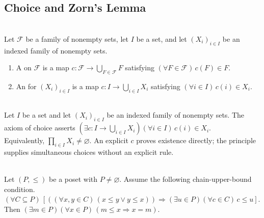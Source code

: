 \subsection{Choice and Zorn's Lemma}

\begin{definition} \label{def:choice-function} \\
Let $\mathcal{F}$ be a family of nonempty sets, let $I$ be a set, and let $(X_i)_{i\in I}$ be an indexed family of nonempty sets.
\begin{enumerate}[label=(\roman*)]
\setlength{\itemsep}{0pt}
\item A  on $\mathcal{F}$ is a map $c:\mathcal{F}\to\bigcup\limits_{F\in\mathcal{F}}F$ satisfying $(\forall F\in\mathcal{F})\,c(F)\in F$.
\item An  for $(X_i)_{i\in I}$ is a map $c:I\to\bigcup\limits_{i\in I}X_i$ satisfying $(\forall i\in I)\,c(i)\in X_i$.
\end{enumerate}
\end{definition}

\begin{principle} \label{princ:axiom-of-choice-analysis} \\
Let $I$ be a set and let $(X_i)_{i\in I}$ be an indexed family of nonempty sets. The axiom of choice asserts $(\exists c:I\to\bigcup\limits_{i\in I}X_i)(\forall i\in I)\,c(i)\in X_i$.\\
Equivalently, $\prod\limits_{i\in I}X_i\neq\varnothing$. An explicit $c$ proves existence directly; the principle supplies simultaneous choices without an explicit rule.
\end{principle}

\begin{principle} \label{princ:zorns-lemma} \\
Let $(P,\leq)$ be a poset with $P\neq\varnothing$. Assume the following chain-upper-bound condition.\\
$(\forall C\subseteq P)\,[((\forall x,y\in C)\,(x\leq y\lor y\leq x))\Rightarrow(\exists u\in P)(\forall c\in C)\,c\leq u]$. Then $(\exists m\in P)(\forall x\in P)\,(m\leq x\Rightarrow x=m)$.
\end{principle}

